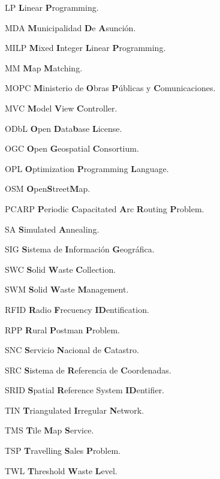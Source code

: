 \begin{abbreviations}
    \item[LP] \textbf{L}inear \textbf{P}rogramming.
    \item[MDA] \textbf{M}unicipalidad \textbf{D}e \textbf{A}sunción.
    \item[MILP] \textbf{M}ixed \textbf{I}nteger \textbf{L}inear \textbf{P}rogramming.
    \item[MM] \textbf{M}ap \textbf{M}atching.
    \item[MOPC] \textbf{M}inisterio de \textbf{O}bras \textbf{P}úblicas y \textbf{C}omunicaciones.
    \item[MVC] \textbf{M}odel \textbf{V}iew \textbf{C}ontroller.
    \item[ODbL] \textbf{O}pen \textbf{D}ata\textbf{b}ase \textbf{L}icense.
    \item[OGC] \textbf{O}pen \textbf{G}eospatial \textbf{C}onsortium.
    \item[OPL] \textbf{O}ptimization \textbf{P}rogramming \textbf{L}anguage.
    \item[OSM] \textbf{O}pen\textbf{S}treet\textbf{M}ap.
    \item[PCARP] \textbf{P}eriodic \textbf{C}apacitated \textbf{A}rc \textbf{R}outing \textbf{P}roblem.
    \item[SA] \textbf{S}imulated \textbf{A}nnealing.
    \item[SIG] \textbf{S}istema de \textbf{I}nformación \textbf{G}eográfica.
    \item[SWC] \textbf{S}olid \textbf{W}aste \textbf{C}ollection.    
    \item[SWM] \textbf{S}olid \textbf{W}aste \textbf{M}anagement.
    \item[RFID] \textbf{R}adio \textbf{F}recuency \textbf{ID}entification.
    \item[RPP] \textbf{R}ural \textbf{P}ostman \textbf{P}roblem.
    \item[SNC] \textbf{S}ervicio \textbf{N}acional de \textbf{C}atastro.
    \item[SRC] \textbf{S}istema de \textbf{R}eferencia de \textbf{C}oordenadas.
    \item[SRID] \textbf{S}patial \textbf{R}eference System \textbf{ID}entifier.
    \item[TIN] \textbf{T}riangulated \textbf{I}rregular \textbf{N}etwork.
    \item[TMS] \textbf{T}ile \textbf{M}ap \textbf{S}ervice.
    \item[TSP] \textbf{T}ravelling \textbf{S}ales \textbf{P}roblem.
    \item[TWL] \textbf{T}hreshold \textbf{W}aste \textbf{L}evel.

\end{abbreviations}
